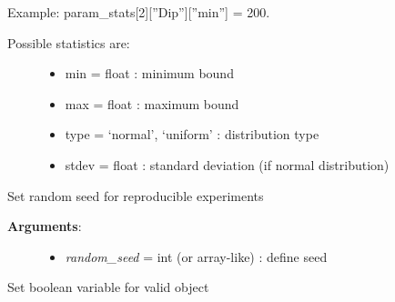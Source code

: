 \documentclass[a4paper,10pt,english]{sphinxmanual}
\begin{document}
\begin{fulllineitems}
\begin{fulllineitems}
Example:
param\_stats{[}2{]}{[}''Dip''{]}{[}''min''{]} = 200.
\begin{description}
\item[{Possible statistics are:}] \leavevmode\begin{itemize}
\item {} 
min = float : minimum bound

\item {} 
max = float : maximum bound

\item {} 
type = `normal', `uniform' : distribution type

\item {} 
stdev = float : standard deviation (if normal distribution)

\end{itemize}

\end{description}

\end{fulllineitems}


\begin{fulllineitems}
\label{pynoddy:pynoddy.experiment.Experiment.set_random_seed}
Set random seed for reproducible experiments
\begin{description}
\item[{\textbf{Arguments}:}] \leavevmode\begin{itemize}
\item {} 
\emph{random\_seed} = int (or array-like) : define seed

\end{itemize}

\end{description}

\end{fulllineitems}


\begin{fulllineitems}
\label{pynoddy:pynoddy.experiment.Experiment.set_up_to_date}
Set boolean variable for valid object

\end{fulllineitems}



\end{fulllineitems}
\end{document}
